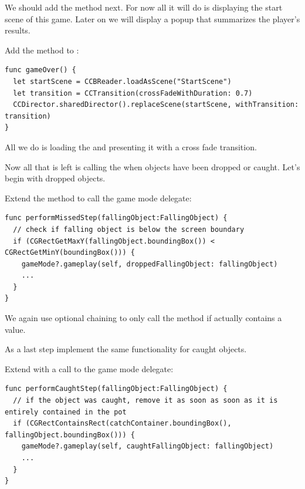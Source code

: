 We should add the  method next. For now all it will do is
displaying the start scene of this game. Later on we will display a popup
that summarizes the player's results.

\begin{leftbar}
Add the  method to :
\begin{lstlisting}
func gameOver() {
  let startScene = CCBReader.loadAsScene("StartScene")
  let transition = CCTransition(crossFadeWithDuration: 0.7)
  CCDirector.sharedDirector().replaceScene(startScene, withTransition: transition)
}
\end{lstlisting}
\end{leftbar}

All we do is loading the  and presenting it with a cross
fade transition.

Now all that is left is calling the  when objects
have been dropped or caught. Let's begin with dropped objects.

\begin{leftbar}
Extend the  method to call the game mode
delegate:
\begin{lstlisting}
func performMissedStep(fallingObject:FallingObject) {
  // check if falling object is below the screen boundary
  if (CGRectGetMaxY(fallingObject.boundingBox()) < CGRectGetMinY(boundingBox())) {
    gameMode?.gameplay(self, droppedFallingObject: fallingObject)
    ...
  }
}
\end{lstlisting}
\end{leftbar}
We again use optional chaining to only call the
 method if
 actually contains a value.

As a last step implement the same functionality for caught objects.
\begin{leftbar}
Extend  with a call to the game mode delegate:
\begin{lstlisting}
func performCaughtStep(fallingObject:FallingObject) {
  // if the object was caught, remove it as soon as soon as it is entirely contained in the pot
  if (CGRectContainsRect(catchContainer.boundingBox(), fallingObject.boundingBox())) {
    gameMode?.gameplay(self, caughtFallingObject: fallingObject)
    ...
  }
}
\end{lstlisting}
\end{leftbar}

